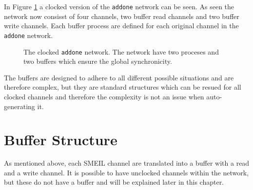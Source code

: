 In Figure \ref{fig:addone_clocked} a clocked version of the \texttt{addone} network can be seen. As seen the network now consisst of four channels, two buffer read channels and two buffer write channels. Each buffer process are defined for each original channel in the \texttt{addone} network. \\

\begin{figure}
\centering
{}
\caption{The clocked \texttt{addone} network. The network have two proceses and two buffers which ensure the global synchronicity.}
\label{fig:addone_clocked}
\end{figure}



The buffers are designed to adhere to all different possible situations and are therefore complex, but they are standard structures which can be resued for all clocked channels and therefore the complexity is not an issue when auto-generating it.



\section{Buffer Structure}
As mentioned above, each SMEIL channel are translated into a buffer with a read and a write channel. It is possible to have unclocked channels within the network, but these do not have a buffer and will be explained later in this chapter. \\

